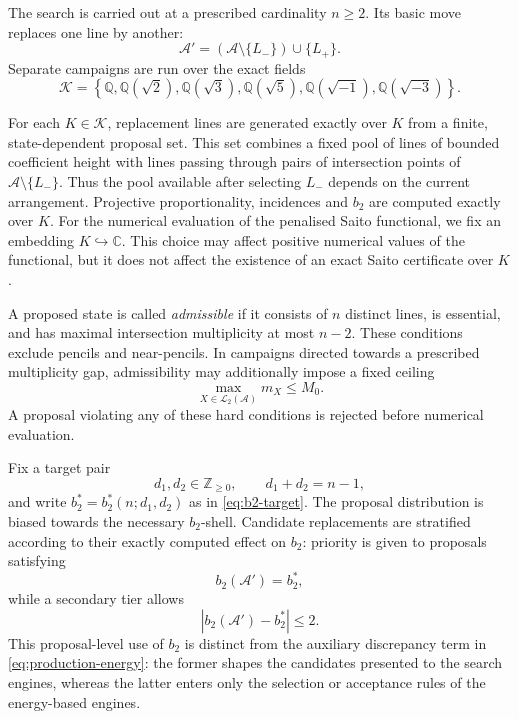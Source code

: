 \documentclass[pdflatex,sn-mathphys-num]{sn-jnl}%
\theoremstyle{remark}
\theoremstyle{definition}
\begin{document}
The search is carried out at a prescribed cardinality $n\geq2$. Its basic move replaces one line by another:
\begin{equation}
\label{eq:line-replacement}
\mathcal{A}'
=
(\mathcal{A}\setminus\{L_-\})\cup\{L_+\}.
\end{equation}
Separate campaigns are run over the exact fields
\begin{equation}
\label{eq:search-fields}
\mathscr K=
\left\{
\mathbb{Q},
\mathbb{Q}(\sqrt2),
\mathbb{Q}(\sqrt3),
\mathbb{Q}(\sqrt5),
\mathbb{Q}(\sqrt{-1}),
\mathbb{Q}(\sqrt{-3})
\right\}.
\end{equation}

For each $K\in\mathscr K$, replacement lines are generated exactly over $K$ from a finite, state-dependent proposal set. This set combines a fixed pool of lines of bounded coefficient height with lines passing through pairs of intersection points of $\mathcal{A}\setminus\{L_-\}$. Thus the pool available after selecting $L_-$ depends on the current arrangement. Projective proportionality, incidences and $b_2$ are computed exactly over $K$. For the numerical evaluation of the penalised Saito functional, we fix an embedding $K\hookrightarrow\mathbb C$. This choice may affect positive numerical values of the functional, but it does not affect the existence of an exact Saito certificate over $K$.

A proposed state is called \emph{admissible} if it consists of $n$ distinct lines, is essential, and has maximal intersection multiplicity at most $n-2$. These conditions exclude pencils and near-pencils. In campaigns directed towards a prescribed multiplicity gap, admissibility may additionally impose a fixed ceiling
\[
\max_{X\in \mathcal{L}_2(\mathcal{A})}m_X\leq M_0.
\]
A proposal violating any of these hard conditions is rejected before numerical evaluation.

Fix a target pair
\[
d_1,d_2\in\mathbb{Z}_{\geq0},
\qquad
d_1+d_2=n-1,
\]
and write $b_2^*=b_2^*(n;d_1,d_2)$ as in \eqref{eq:b2-target}. The proposal distribution is biased towards the necessary $b_2$-shell. Candidate replacements are stratified according to their exactly computed effect on $b_2$: priority is given to proposals satisfying
\[
b_2(\mathcal{A}')=b_2^*,
\]
while a secondary tier allows
\[
|b_2(\mathcal{A}')-b_2^*|\leq2.
\]
This proposal-level use of $b_2$ is distinct from the auxiliary discrepancy term in \eqref{eq:production-energy}: the former shapes the candidates presented to the search engines, whereas the latter enters only the selection or acceptance rules of the energy-based engines.
\end{document}
